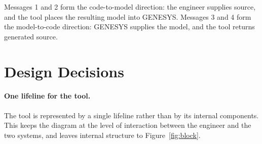 Messages 1 and 2 form the code-to-model direction: the engineer supplies source,
and the tool places the resulting model into GENESYS. Messages 3 and 4 form the
model-to-code direction: GENESYS supplies the model, and the tool returns
generated source.

\section{Design Decisions}

\paragraph{One lifeline for the tool.}
The tool is represented by a single lifeline rather than by its internal
components. This keeps the diagram at the level of interaction between the
engineer and the two systems, and leaves internal structure to
Figure~\ref{fig:block}.
